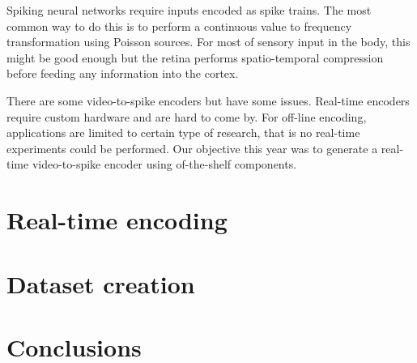 Spiking neural networks require inputs encoded as spike trains. The most common way to do this is to perform a continuous value to frequency transformation using Poisson sources. For most of sensory input in the body, this might be good enough but the retina performs spatio-temporal compression before feeding any information into the cortex.

There are some video-to-spike encoders but have some issues. Real-time encoders require custom hardware and are hard to come by. For off-line encoding, applications are limited to certain type of research, that is no real-time experiments could be performed. Our objective this year was to generate a real-time video-to-spike encoder using of-the-shelf components. 

\section{Real-time encoding}

%

\section{Dataset creation}

\section{Conclusions}

